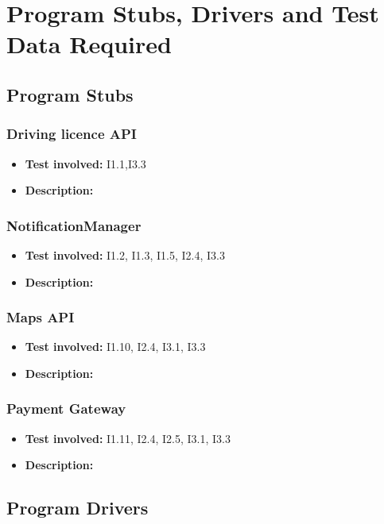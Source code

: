 \chapter{Program Stubs, Drivers and Test Data Required}

\section{Program Stubs}

\subsection{Driving licence API}
\begin{itemize}
\item \textbf{Test involved:} I1.1,I3.3
\item \textbf{Description:}
\end{itemize}

\subsection{NotificationManager}
\begin{itemize}
\item \textbf{Test involved:} I1.2, I1.3, I1.5, I2.4, I3.3
\item \textbf{Description:}
\end{itemize}

\subsection{Maps API}
\begin{itemize}
\item \textbf{Test involved:} I1.10, I2.4, I3.1, I3.3
\item \textbf{Description:}
\end{itemize}

\subsection{Payment Gateway}
\begin{itemize}
\item \textbf{Test involved:} I1.11, I2.4, I2.5, I3.1, I3.3
\item \textbf{Description:}
\end{itemize}

\section{Program Drivers}

